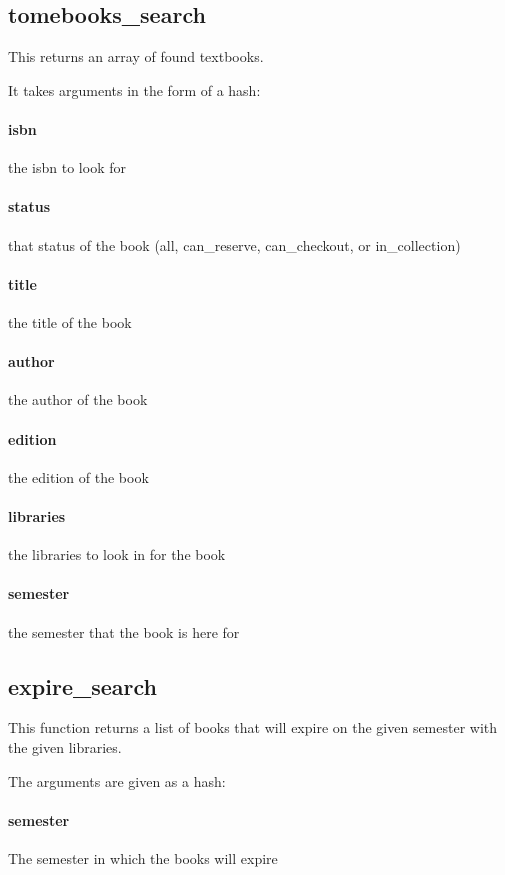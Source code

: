 \documentclass[12pt,titlepage]{article}
\begin{document}
\subsection{tomebooks\_search}
This returns an array of found textbooks.

It takes arguments in the form of a hash:
\paragraph{isbn}
the isbn to look for 

\paragraph{status}
that status of the book (all, can\_reserve, can\_checkout, or in\_collection) 

\paragraph{title}
the title of the book 

\paragraph{author}
the author of the book 

\paragraph{edition}
the edition of the book 

\paragraph{libraries}
the libraries to look in for the book

\paragraph{semester}
the semester that the book is here for

\subsection{expire\_search}
This function returns a list of books that will expire on the given semester with the given libraries.

The arguments are given as a hash:
\paragraph{semester}
The semester in which the books will expire 
\end{document}

